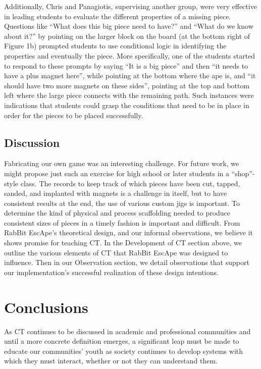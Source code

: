 \documentclass{acm_proc_article-sp}
\begin{document}
Additionally, Chris and Panagiotis, supervising another group, were very effective in leading students to evaluate the different properties of a missing piece. Questions like ``What does this big piece need to have?'' and ``What do we know about it?'' by pointing on the larger block on the board (at the bottom right of Figure 1b) prompted students to use conditional logic in identifying the properties and eventually the piece. More specifically, one of the students started to respond to these prompts by saying ``It is a big piece'' and then ``it needs to have a plus magnet here'', while pointing at the bottom where the ape is, and ``it should have two more magnets on these sides'', pointing at the top and bottom left where the large piece connects with the remaining path. Such instances were indications that students could grasp the conditions that need to be in place in order for the pieces to be placed successfully.

\subsection{Discussion}
Fabricating our own game was an interesting challenge. For future work, we might propose just such an exercise for high school or later students in a ``shop''-style class. The records to keep track of which pieces have been cut, tapped, sanded, and implanted with magnets is a challenge in itself, but to have consistent results at the end, the use of various custom jigs is important. To determine the kind of physical and process scaffolding needed to produce consistent sizes of pieces in a timely fashion is important and difficult. 
From RabBit EscApe's theoretical design, and our informal observations, we believe it shows promise for teaching CT. In the Development of CT section above, we outline the various elements of CT that RabBit EscApe was designed to influence. Then in our Observation section, we detail observations that support our implementation's successful realization of these design intentions. 

\section{Conclusions}
As CT continues to be discussed in academic and professional communities and until a more concrete definition emerges, a significant leap must be made to educate our communities' youth as society continues to develop systems with which they must interact, whether or not they can understand them. 
\end{document}
